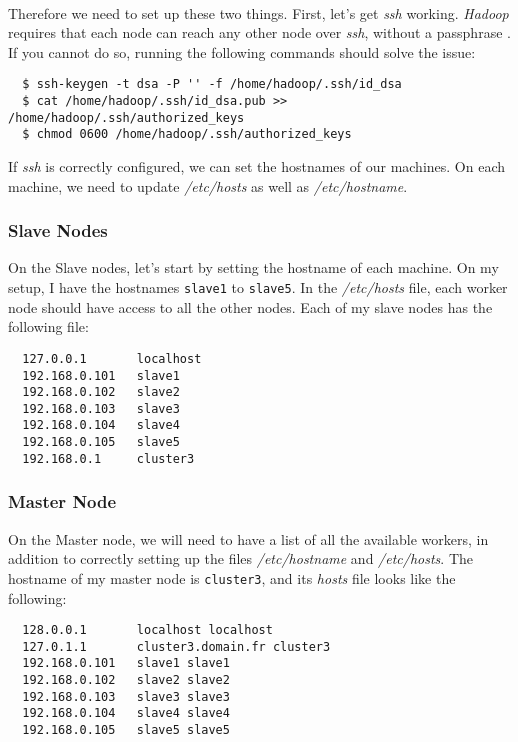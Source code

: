 \documentclass[a4paper, 12pt]{article}
\begin{document}
~\\
Therefore we need to set up these two things. First, let's get \textit{ssh} working. \textit{Hadoop} requires that each node can reach any other node over \textit{ssh}, without a passphrase \cite{hadoop_single_node_setup}. If you cannot do so, running the following commands should solve the issue:

\begin{verbatim}
  $ ssh-keygen -t dsa -P '' -f /home/hadoop/.ssh/id_dsa
  $ cat /home/hadoop/.ssh/id_dsa.pub >> /home/hadoop/.ssh/authorized_keys
  $ chmod 0600 /home/hadoop/.ssh/authorized_keys
\end{verbatim}

If \textit{ssh} is correctly configured, we can set the hostnames of our machines. On each machine, we need to update \textit{/etc/hosts} as well as \textit{/etc/hostname}.

    \subsubsection{Slave Nodes}
    
On the Slave nodes, let's start by setting the hostname of each machine. On my setup, I have the hostnames \texttt{slave1} to \texttt{slave5}. In the \textit{/etc/hosts} file, each worker node should have access to all the other nodes. Each of my slave nodes has the following file:

\begin{verbatim}
  127.0.0.1       localhost
  192.168.0.101   slave1
  192.168.0.102   slave2
  192.168.0.103   slave3
  192.168.0.104   slave4
  192.168.0.105   slave5
  192.168.0.1     cluster3
\end{verbatim}

    \subsubsection{Master Node}
    
On the Master node, we will need to have a list of all the available workers, in addition to correctly setting up the files \textit{/etc/hostname} and \textit{/etc/hosts}. The hostname of my master node is \texttt{cluster3}, and its \textit{hosts} file looks like the following:

\begin{verbatim}
  128.0.0.1       localhost localhost
  127.0.1.1       cluster3.domain.fr cluster3
  192.168.0.101   slave1 slave1
  192.168.0.102   slave2 slave2
  192.168.0.103   slave3 slave3
  192.168.0.104   slave4 slave4
  192.168.0.105   slave5 slave5
\end{verbatim}
\end{document}
